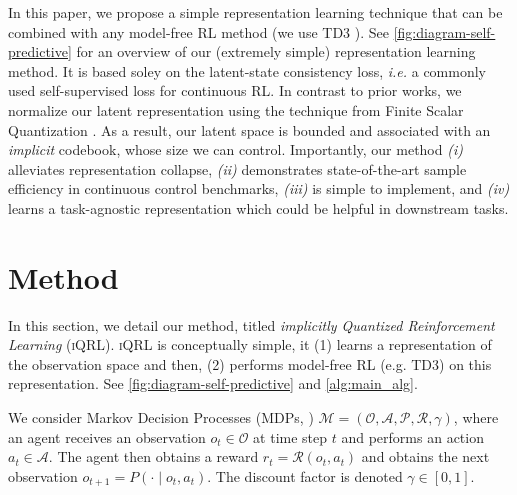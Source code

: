\documentclass{article}
\makeatletter
\theoremstyle{plain}
\theoremstyle{definition}
\theoremstyle{remark}
\newcommand{\our}{\textsc{iQRL}\xspace}
\newcommand{\ie}{\textit{i.e.\@}\xspace}
\makeatother
\begin{document}
In this paper, we propose a simple representation learning technique that can be combined with any model-free RL method
(we use TD3 \citep{fujimotoAddressingFunctionApproximation2018}).
See \cref{fig:diagram-self-predictive} for an overview of our (extremely simple) representation learning method.
It is based soley on the latent-state consistency loss, \ie a commonly used self-supervised loss for continuous RL.
In contrast to prior works, we normalize our latent representation using the technique from Finite Scalar Quantization
\citep{mentzerFiniteScalarQuantization2023}.
As a result, our latent space is bounded and associated with an \textit{implicit} codebook, whose size we can control.
Importantly, our method {\em (i)} alleviates representation collapse,
{\em (ii)} demonstrates state-of-the-art sample efficiency in continuous control benchmarks,
{\em (iii)} is simple to implement, and {\em (iv)} learns a task-agnostic
representation which could be helpful in downstream tasks.


\section{Method}
\label{sec:method}

In this section, we detail our method, titled \textit{implicitly Quantized Reinforcement Learning} (\our).
\our is conceptually simple, it (1) learns a representation of the observation space and then,
(2) performs model-free RL (e.g. TD3) on this representation.
See \cref{fig:diagram-self-predictive} and \cref{alg:main_alg}.

We consider Markov Decision Processes (MDPs, \citet{bellmanMarkovianDecisionProcess1957a}) $\mathcal{M} = (\mathcal{O}, \mathcal{A}, \mathcal{P}, \mathcal{R}, \gamma)$,
where an agent receives an observation $o_{t} \in \mathcal{O}$ at time step $t$ and performs an action $a_{t} \in \mathcal{A}$.
The agent then obtains a reward $r_{t} = \mathcal{R} (o_{t}, a_{t})$ and obtains the next observation
$o_{t+1} = P(\cdot \mid o_{t}, a_{t})$.
The discount factor is denoted $\gamma \in [0, 1]$.
\end{document}
